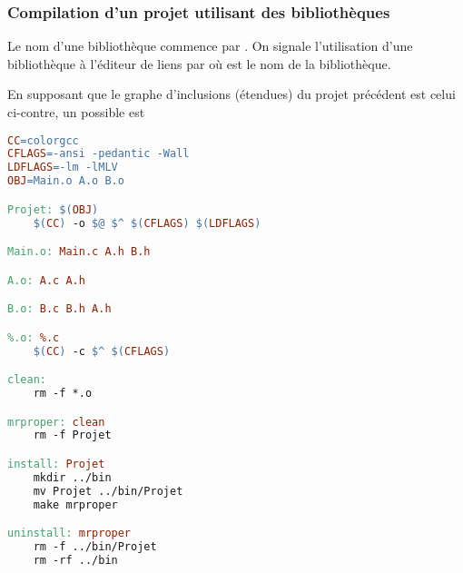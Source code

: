 \begin{frame}[fragile]
\frametitle{Compilation d'un projet utilisant des bibliothèques}
Le nom d'une bibliothèque commence par . On signale l'utilisation
d'une bibliothèque à l'éditeur de liens par  où 
est le nom de la bibliothèque.

\begin{multicols}{2}
\footnotesize
En supposant que le graphe d'inclusions (étendues) du projet précédent
est celui ci-contre, un  possible est
\begin{center}
\end{center}
\end{multicols}\vspace{-1.5em}
\begin{multicols}{2}
\begin{lstlisting}[language=make,basicstyle=\scriptsize\tt]
CC=colorgcc
CFLAGS=-ansi -pedantic -Wall
LDFLAGS=-lm -lMLV
OBJ=Main.o A.o B.o

Projet: $(OBJ)
    $(CC) -o $@ $^ $(CFLAGS) $(LDFLAGS)

Main.o: Main.c A.h B.h

A.o: A.c A.h

B.o: B.c B.h A.h

%.o: %.c
    $(CC) -c $^ $(CFLAGS)

clean:
    rm -f *.o

mrproper: clean
    rm -f Projet

install: Projet
    mkdir ../bin
    mv Projet ../bin/Projet
    make mrproper

uninstall: mrproper
    rm -f ../bin/Projet
    rm -rf ../bin
\end{lstlisting}
\begin{math}\end{math}
\end{multicols}
\end{frame}

